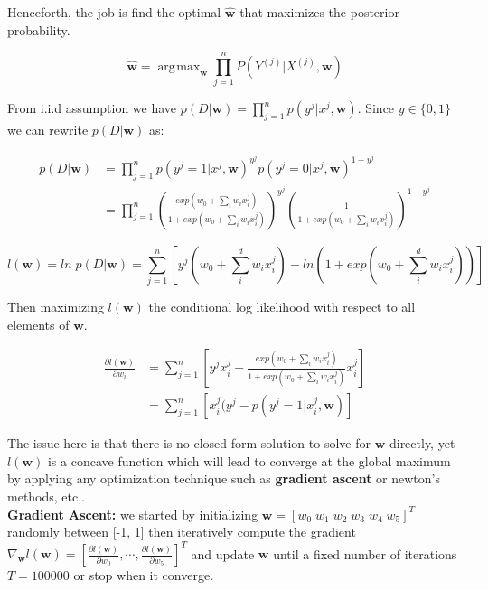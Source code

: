 \documentclass[a4paper]{article}
\DeclareMathOperator*{\argmax}{\arg\!\max}
\begin{document}
	Henceforth, the job is find the optimal $\hat{\mathbf{w}}$ that maximizes the posterior probability.
	
	\begin{equation}
		\hat{\mathbf{w}} = \argmax_{\mathbf{w}} \prod_{j=1}^n P(Y^{(j)}|X^{(j)},\mathbf{w})
	\end{equation}
	
	From i.i.d assumption we have $p(D|\mathbf{w}) = \prod_{j=1}^{n} p(y^j|x^j,\mathbf{w})$. Since $y \in \{0, 1\}$ we can rewrite $p(D|\mathbf{w})$ as:
	
	\begin{align}
		p(D|\mathbf{w}) &= \prod_{j=1}^n p(y^j=1|x^j,\mathbf{w})^{y^j}p(y^j=0|x^j,\mathbf{w})^{1-y^j} \\ 
			&= \prod_{j=1}^n \left(\frac{exp(w_0+\sum_i w_ix_i^j)}{1+exp(w_0+\sum_i w_ix_i^j)}\right)^{y^j}\left(\frac{1}{1+exp(w_0+\sum_i w_ix_i^j)}\right)^{1-y^j}
	\end{align}
	
	\begin{equation}
		l(\mathbf{w}) = ln\;p(D|\mathbf{w}) = \sum_{j=1}^n \left[y^j(w_0+\sum_i^d w_ix_i^j)-ln(1+exp(w_0+\sum_i^d w_ix_i^j))\right]
	\end{equation}
	
	Then maximizing $l(\mathbf{w})$ the conditional log likelihood with respect to all elements of $\mathbf{w}$.
	
	\begin{align}
		\frac{\partial l(\mathbf{w})}{\partial w_i} &= \sum_{j=1}^n \left[y^jx_i^j - \frac{exp(w_0+\sum_i w_ix_i^j)}{1+exp(w_0+\sum_i w_ix_i^j)}x_i^j\right] \\ 
			&= \sum_{j=1}^n \left[x_i^j(y^j - p(y^j=1|x_i^j, \mathbf{w})\right]
	\end{align}
	
	The issue here is that there is no closed-form solution to solve for $\mathbf{w}$ directly, yet $l(\mathbf{w})$ is a concave function which will lead to converge at the global maximum by applying any optimization technique such as \textbf{gradient ascent} or newton's methods, etc,. \\
	
	\textbf{Gradient Ascent: } we started by initializing $\mathbf{w} = [w_0\; w_1\; w_2\; w_3\; w_4\; w_5]^T$ randomly between [-1, 1] then iteratively compute the gradient 
	$ \nabla_{\mathbf{w}} l(\mathbf{w}) = \left[
		\frac{\partial l(\mathbf{w})}{\partial w_0}, \cdots, 
		\frac{\partial l(\mathbf{w})}{\partial w_5}
	\right]^T$ and update $\mathbf{w}$ until a fixed number of iterations $T = 100000$ or stop when it converge.
	
\end{document}
